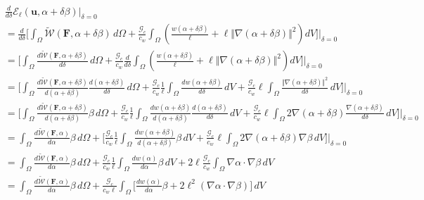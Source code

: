 \documentclass[12pt,3p]{article}
\numberwithin{equation}{section}
\begin{document}
\begin{align*}
& \frac{d}{d \delta} \mathcal{E}_\ell (\bm{u}, \alpha + \delta \beta) \big\rvert_{\delta = 0} \\
	&= \frac{d}{d \delta} \bigg[ \int_\Omega  \widetilde{\mathcal{W}}(\mathbf{F}, \alpha + \delta \beta)\,  d\Omega +\frac{\mathcal{G}_c}{c_w}\int_\Omega \left(\frac{w(\alpha + \delta \beta)}{\ell} + \ell \Vert \nabla (\alpha + \delta \beta)  \Vert^2\right) dV \bigg] \bigg\rvert_{\delta = 0} \\
	&= \bigg[ \int_\Omega  \frac{d \widetilde{\mathcal{W}}(\mathbf{F}, \alpha + \delta \beta)}{d \delta} \,  d\Omega + \frac{\mathcal{G}_c}{c_w} \frac{d}{d \delta} \int_\Omega \left(\frac{w(\alpha + \delta \beta)}{\ell} + \ell \Vert \nabla (\alpha + \delta \beta)  \Vert^2\right) dV \bigg] \bigg\rvert_{\delta = 0} \\
	&= \bigg[ \int_\Omega \frac{d \widetilde{\mathcal{W}}(\mathbf{F}, \alpha + \delta \beta)}{d (\alpha + \delta \beta)} \frac{d (\alpha + \delta \beta)}{d \delta} \, d\Omega + \frac{\mathcal{G}_c}{c_w} \frac{1}{\ell} \int_\Omega \frac{d w(\alpha + \delta \beta)}{d \delta} \, dV+ \frac{\mathcal{G}_c}{c_w} \ell \int_{\Omega} \frac{\Vert \nabla (\alpha + \delta \beta)  \Vert^2}{d \delta} \, dV \bigg] \bigg\rvert_{\delta = 0} \\
	&= \bigg[ \int_\Omega \frac{d \widetilde{\mathcal{W}}(\mathbf{F}, \alpha + \delta \beta)}{d (\alpha + \delta \beta)} \beta \, d\Omega + \frac{\mathcal{G}_c}{c_w} \frac{1}{\ell} \int_\Omega \frac{d w(\alpha + \delta \beta)}{d (\alpha + \delta \beta)} \frac{d (\alpha + \delta \beta)}{d \delta} \, dV + \frac{\mathcal{G}_c}{c_w} \ell \int_{\Omega} 2 \nabla (\alpha + \delta \beta) \frac{\nabla (\alpha + \delta \beta)}{d \delta} \, dV \bigg] \bigg\rvert_{\delta = 0} \\
	&= \int_\Omega \frac{d \widetilde{\mathcal{W}}(\mathbf{F}, \alpha)}{d \alpha} \beta \, d\Omega + \bigg[ \frac{\mathcal{G}_c}{c_w} \frac{1}{\ell} \int_\Omega \frac{d w(\alpha + \delta \beta)}{d (\alpha + \delta \beta)} \beta \, dV + \frac{\mathcal{G}_c}{c_w} \ell \int_{\Omega} 2 \nabla (\alpha + \delta \beta) \nabla \beta \, dV \bigg] \bigg\rvert_{\delta = 0} \\
	&= \int_\Omega \frac{d \widetilde{\mathcal{W}}(\mathbf{F}, \alpha)}{d \alpha} \beta \, d\Omega +  \frac{\mathcal{G}_c}{c_w} \frac{1}{\ell} \int_\Omega \frac{d w(\alpha)}{d \alpha} \beta \, dV + 2 \ell \frac{\mathcal{G}_c}{c_w} \int_{\Omega} \nabla \alpha \cdot \nabla \beta \, dV \\
	&= \int_\Omega \frac{d \widetilde{\mathcal{W}}(\mathbf{F}, \alpha)}{d \alpha} \beta \, d\Omega + \frac{\mathcal{G}_c}{c_w \ell} \int_\Omega \bigg[ \frac{d w(\alpha)}{d \alpha} \beta + 2 \ell^2 (\nabla \alpha \cdot \nabla \beta) \bigg] \, dV 
\end{align*}
\end{document}
